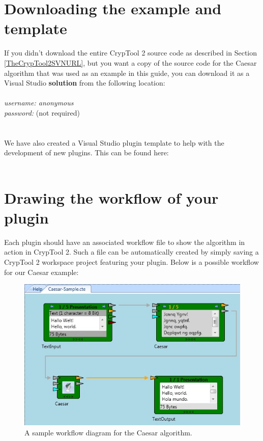 \section{Downloading the example and template}
\label{sec:DownloadingTheExampleAndTemplate}

If you didn't download the entire CrypTool 2 source code as described in Section \ref{TheCrypTool2SVNURL}, but you want a copy of the source code for the Caesar algorithm that was used as an example in this guide, you can download it as a Visual Studio \textbf{solution} from the following location:\\\\
\textit{username: anonymous\\
password:} (not required)\\
\\\\
We have also created a Visual Studio plugin template to help with the development of new plugins. This can be found here:\\\\
\clearpage

\section{Drawing the workflow of your plugin}
\label{DrawingTheWorkfloweOfYourPlugin}

Each plugin should have an associated workflow file to show the algorithm in action in CrypTool 2. Such a file can be automatically created by simply saving a CrypTool 2 workspace project featuring your plugin. Below is a possible workflow for our Caesar example:

\begin{figure}[h]
	\centering
		\includegraphics{figures/sample.jpg}
	\caption{A sample workflow diagram for the Caesar algorithm.}
	\label{fig:sample}
\end{figure}
